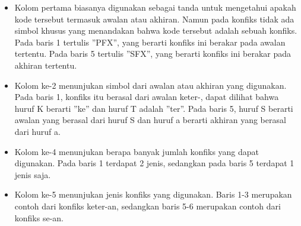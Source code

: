 \begin{enumerate}
	\begin{itemize}
		\item Kolom pertama biasanya digunakan sebagai tanda untuk mengetahui apakah kode tersebut termasuk awalan atau akhiran. Namun pada konfiks tidak ada simbol khusus yang menandakan bahwa kode tersebut adalah sebuah konfiks. Pada baris 1 tertulis ”PFX”, yang berarti konfiks ini berakar pada awalan tertentu. Pada baris 5 tertulis ”SFX”, yang berarti konfiks ini berakar pada akhiran tertentu.
		
		\item Kolom ke-2 menunjukan simbol dari awalan atau akhiran yang digunakan. Pada baris 1, konfiks itu berasal dari awalan keter-, dapat dilihat bahwa huruf K berarti ”ke” dan huruf T adalah ”ter”. Pada baris 5, huruf S berarti awalan yang berasal dari huruf S dan huruf a berarti akhiran yang berasal dari huruf a.
		
		\item Kolom ke-4 menunjukan berapa banyak jumlah konfiks yang dapat digunakan. Pada baris 1 terdapat 2 jenis, sedangkan pada baris 5 terdapat 1 jenis saja.
		
		\item Kolom ke-5 menunjukan jenis konfiks yang digunakan. Baris 1-3 merupakan contoh dari konfiks keter-an, sedangkan baris 5-6 merupakan contoh dari konfiks se-an.
	\end{itemize}
	
\end{enumerate}